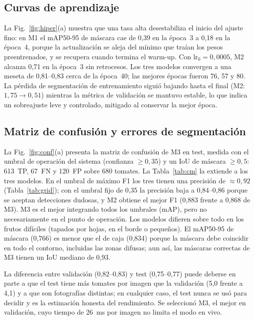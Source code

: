 \documentclass[conference]{IEEEtran}
\begin{document}
\subsection{Curvas de aprendizaje}
La Fig.~\ref{fig:hiper}(a) muestra que una tasa alta desestabiliza el inicio del ajuste fino: en M1 el mAP50-95 de máscara cae de 0,39 en la época~3 a 0,18 en la época~4, porque la actualización se aleja del mínimo que traían los pesos preentrenados, y se recupera cuando termina el warm-up. Con $\mathrm{lr}_0=0{,}0005$, M2 alcanza 0,71 en la época~3 sin retrocesos. Los tres modelos convergen a una meseta de 0,81--0,83 cerca de la época~40; las mejores épocas fueron 76, 57 y 80. La pérdida de segmentación de entrenamiento siguió bajando hasta el final (M2: $1{,}75\to0{,}51$) mientras la métrica de validación se mantuvo estable, lo que indica un sobreajuste leve y controlado, mitigado al conservar la mejor época.

\subsection{Matriz de confusión y errores de segmentación}
La Fig.~\ref{fig:conf}(a) presenta la matriz de confusión de M3 en test, medida con el umbral de operación del sistema (confianza $\ge0{,}35$) y un IoU de máscara $\ge0{,}5$: 613~TP, 67~FN y 120~FP sobre 680 tomates. La Tabla~\ref{tab:cm} la extiende a los tres modelos. En el umbral de máximo F1 los tres tienen una precisión de $\approx0{,}92$ (Tabla~\ref{tab:grid}); con el umbral fijo de 0,35 la precisión baja a 0,84--0,86 porque se aceptan detecciones dudosas, y M2 obtiene el mejor F1 (0,883 frente a 0,868 de M3). M3 es el mejor integrando todos los umbrales (mAP), pero no necesariamente en el punto de operación. Los modelos difieren sobre todo en los frutos difíciles (tapados por hojas, en el borde o pequeños). El mAP50-95 de máscara (0,766) es menor que el de caja (0,834) porque la máscara debe coincidir en todo el contorno, incluidas las zonas difusas; aun así, las máscaras correctas de M3 tienen un IoU mediano de 0,93.

La diferencia entre validación (0,82--0,83) y test (0,75--0,77) puede deberse en parte a que el test tiene más tomates por imagen que la validación (5,0 frente a 4,1) y a que son fotografías distintas; en cualquier caso, el test nunca se usó para decidir y es la estimación honesta del rendimiento. Se seleccionó M3, el mejor en validación, cuyo tiempo de 26~ms por imagen no limita el modo en vivo.
\end{document}
